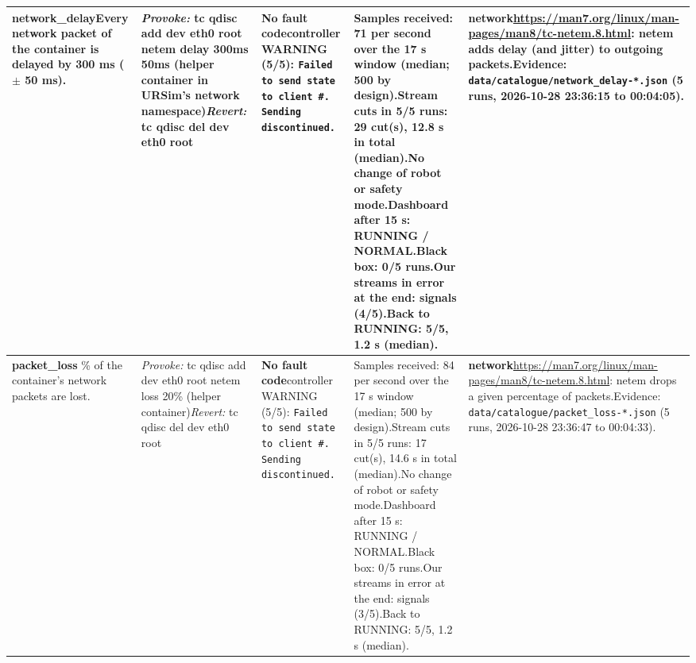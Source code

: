 \documentclass[10pt]{article}
\begin{document}
\begin{longtable}{@{}>{\raggedright\arraybackslash}p{2.7cm}>{\raggedright\arraybackslash}p{4.0cm}>{\raggedright\arraybackslash}p{7.6cm}>{\raggedright\arraybackslash}p{5.2cm}>{\raggedright\arraybackslash}p{6.0cm}@{}}
\textbf{network\_\allowbreak{}delay}\newline Every network packet of the container is delayed by 300 ms ($\pm$ 50 ms). & \textit{Provoke:} tc qdisc add dev eth0 root netem delay 300ms 50ms  (helper container in URSim's network namespace)\newline\textit{Revert:} tc qdisc del dev eth0 root & \textbf{No fault code}\newline \textsf{controller} WARNING (5/5): \texttt{Failed to send state to client \#. Sending discontinued.} & Samples received: 71 per second over the 17 s window (median; 500 by design).\newline Stream cuts in 5/5 runs: 29 cut(s), 12.8 s in total (median).\newline No change of robot or safety mode.\newline Dashboard after 15 s: RUNNING / NORMAL.\newline Black box: 0/5 runs.\newline Our streams in error at the end: signals (4/5).\newline Back to RUNNING: 5/5, 1.2 s (median). & \textbf{network}\newline \url{https://man7.org/linux/man-pages/man8/tc-netem.8.html}: netem adds delay (and jitter) to outgoing packets.\newline Evidence: \texttt{data/catalogue/network\_\allowbreak{}delay-*.json} (5 runs, 2026-10-28 23:36:15 to 00:04:05). \\ \midrule
\textbf{packet\_\allowbreak{}loss}\newline 20 \% of the container's network packets are lost. & \textit{Provoke:} tc qdisc add dev eth0 root netem loss 20\%  (helper container)\newline\textit{Revert:} tc qdisc del dev eth0 root & \textbf{No fault code}\newline \textsf{controller} WARNING (5/5): \texttt{Failed to send state to client \#. Sending discontinued.} & Samples received: 84 per second over the 17 s window (median; 500 by design).\newline Stream cuts in 5/5 runs: 17 cut(s), 14.6 s in total (median).\newline No change of robot or safety mode.\newline Dashboard after 15 s: RUNNING / NORMAL.\newline Black box: 0/5 runs.\newline Our streams in error at the end: signals (3/5).\newline Back to RUNNING: 5/5, 1.2 s (median). & \textbf{network}\newline \url{https://man7.org/linux/man-pages/man8/tc-netem.8.html}: netem drops a given percentage of packets.\newline Evidence: \texttt{data/catalogue/packet\_\allowbreak{}loss-*.json} (5 runs, 2026-10-28 23:36:47 to 00:04:33). \\ \midrule

\end{longtable}
\end{document}
